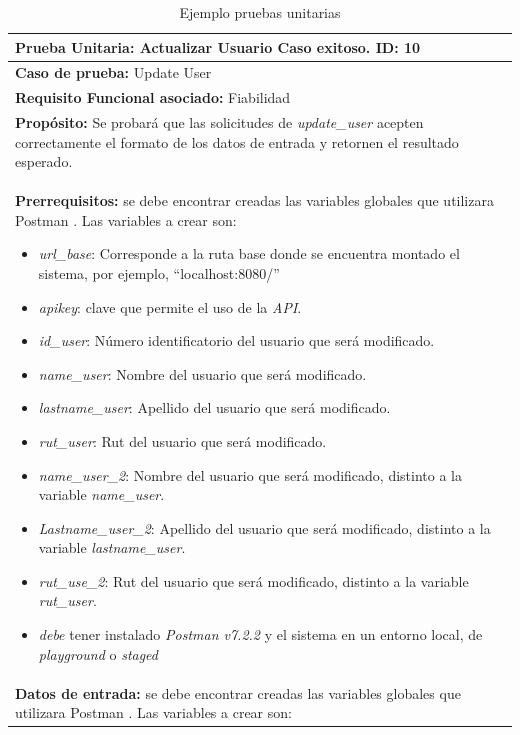 \begin{table}[H]
    \caption[Ejemplo pruebas unitarias] {Ejemplo pruebas unitarias}
    \label{tbl:ejemplo pruebas unitarias}
    \begin{tabular}{|p{}|}
        \hline
        \textbf{Prueba Unitaria: Actualizar Usuario Caso exitoso. \hfill ID: 10} \\
    	\hline
    	\hline
    	\textbf{Caso de prueba:} Update User \\
    	\hline
    	\textbf{Requisito Funcional asociado:} Fiabilidad \\
    	\hline
    	\textbf{Propósito:} Se probará que las solicitudes de \textit{update\_user} acepten correctamente el formato de los datos de entrada y retornen el resultado esperado. \\
    	\hline
    	\textbf{Prerrequisitos: }
		se debe encontrar creadas las variables globales que utilizara Postman . Las variables a crear son:
		\begin{itemize}
			\item \textit{url\_base}: Corresponde a la ruta base donde se encuentra montado el sistema, por ejemplo, “localhost:8080/”
			\item \textit{apikey}: clave que permite el uso de la \textit{API}. 
			\item \textit{id\_user}: Número identificatorio del usuario que será modificado.
			\item \textit{name\_user}: Nombre del usuario que será modificado. 
			\item \textit{lastname\_user}: Apellido del usuario que será modificado.
			\item \textit{rut\_user}: Rut del usuario que será modificado.
			\item \textit{name\_user\_2}: Nombre del usuario que será modificado, distinto a la variable \textit{name\_user}.
			\item \textit{Lastname\_user\_2}: Apellido del usuario que será modificado, distinto a la variable \textit{lastname\_user}.
			\item \textit{rut\_use\_2}: Rut del usuario que será modificado, distinto a la variable \textit{rut\_user}.
			\item \textit{debe} tener instalado \textit{Postman v7.2.2} y el sistema en un entorno local, de \textit{playground} o \textit{staged}
		\end{itemize} \\ \hline
		\textbf{Datos de entrada: }
		se debe encontrar creadas las variables globales que utilizara Postman . Las variables a crear son:

\end{tabular}
\end{table}

